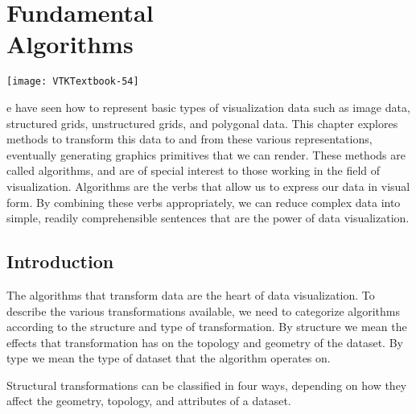 \chapter[Fundamental Algorithms]{Fundamental\\ Algorithms}
\label{chap:fundamental_algorithms}

\vspace{-9\baselineskip} %
\hfill
 \begin{minipage}{0.5\textwidth}
 \centering
 \texttt{[image: VTKTextbook-54]}
 \end{minipage}
\vspace{2\baselineskip}

e have seen how to represent basic types of visualization data such as image data, structured grids, unstructured grids, and polygonal data.
This chapter explores methods to transform this data to and from these various representations, eventually generating graphics primitives that we can render.
These methods are called algorithms, and are of special interest to those working in the field of visualization.
Algorithms are the verbs that allow us to express our data in visual form.
By combining these verbs appropriately, we can reduce complex data into simple, readily comprehensible sentences that are the power of data visualization.

\section{Introduction}

The algorithms that transform data are the heart of data visualization.
To describe the various transformations available, we need to categorize algorithms according to the structure and type of transformation. By structure we mean the effects that transformation has on the topology and geometry of the dataset. By type we mean the type of dataset that the algorithm operates on.

Structural transformations can be classified in four ways, depending on how they affect the geometry, topology, and attributes of a dataset.

